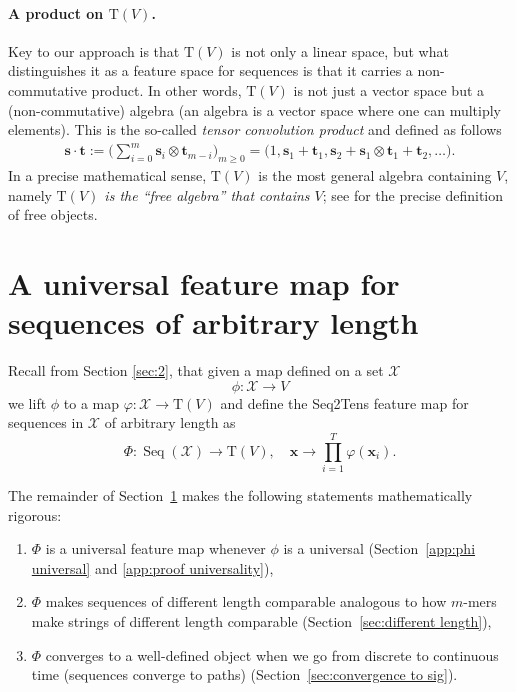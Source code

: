 \documentclass{article} \usepackage{iclr2021_conference,times}
\newcommand{\bx}{\mathbf{x}}
\newcommand{\cX}{\mathcal{X}}
\newcommand{\T}[1]{\mathrm{T}({#1})}
\newcommand{\bt}{\mathbf{t}}
\newcommand{\bs}{\mathbf{s}}
\newcommand{\Seq}[1]{\operatorname{Seq}(#1)}
\theoremstyle{plain}
\theoremstyle{definition}
\begin{document}
  \paragraph{A product on $\T{V}$.}
  Key to our approach is that $\T{V}$ is not only a linear space, but what distinguishes it as a feature space for sequences is that it carries a non-commutative product.
  In other words, $\T{V}$ is not just a vector space but a (non-commutative) algebra (an algebra is a vector space where one can multiply elements).
  This is the so-called \emph{tensor convolution product} and defined as follows
	\begin{align}\label{eq:ncp}
    \bs \cdot \bt := \big( \sum_{i=0}^m \bs_i\otimes \bt_{m-i} \big)_{m\geq 0} = \big( 1, \bs_1 + \bt_1, \bs_2 + \bs_1\otimes \bt_1 + \bt_2,\ldots \big).
	\end{align}
In a precise mathematical sense, $ \T{V} $ is the most general algebra
  containing $ V $, namely \emph{$\T{V}$ is the ``free algebra'' that contains $V$}; see \cite[Chapter 16]{Lang} for the precise definition of free objects.












\section{A universal feature map for sequences of arbitrary length} \label{app:algebra}
Recall from Section \ref{sec:2}, that given a map defined on a set $\cX$
\[ \phi: \cX \to V \]
we lift $ \phi $ to a map $ \varphi: \cX \to \T{V} $ and define the Seq2Tens feature map for sequences in $\cX$ of arbitrary length as 
\[\Phi:\Seq{\cX} \rightarrow \T{V},\quad \bx \to \prod_{i=1}^T  \varphi(\bx_i).\] 


The remainder of Section~\ref{app:algebra} makes the following statements mathematically rigorous:
\begin{enumerate}[label=(\roman*)]
  \item 
    $\Phi$ is a universal feature map whenever $\phi$ is a universal (Section~\ref{app:phi universal} and \ref{app:proof universality}), 
  \item
    $\Phi$ makes sequences of different length comparable analogous to how $m$-mers make strings of different length comparable (Section~\ref{sec:different length}),  
  \item
    $\Phi$ converges to a well-defined object when we go from discrete to continuous time (sequences converge to paths) (Section~\ref{sec:convergence to sig}).
\end{enumerate}
\end{document}
